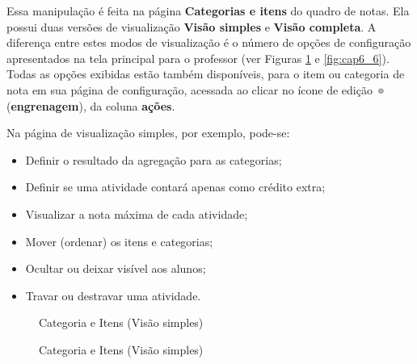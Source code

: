 Essa manipulação é feita na página \textbf{Categorias e itens} do quadro de notas. Ela possui duas versões de visualização \textbf{Visão simples} e \textbf{Visão completa}. A diferença entre estes modos de visualização é o número de opções de configuração apresentados na tela principal para o professor (ver Figuras \ref{fig:cap6_1} e \ref{fig:cap6_6}). Todas as opções exibidas estão também disponíveis, para o item ou categoria de nota em sua página de configuração, acessada ao clicar no ícone de edição \includegraphics[width=0.02\textwidth]{imagem/cap5/fig7.jpg} (\textbf{engrenagem}), da coluna \textbf{ações}.

Na página de visualização simples, por exemplo, pode-se:

\begin{itemize}
 \item Definir o resultado da agregação para as categorias;
 \item Definir se uma atividade contará apenas como crédito extra;
 \item Visualizar a nota máxima de cada atividade;
 \item Mover (ordenar) os itens e categorias;
 \item Ocultar ou deixar visível aos alunos;
 \item Travar ou destravar uma atividade.
\end{itemize}

\begin{figure}[htbp]
 \begin{center}
  \caption{Categoria e Itens (Visão simples)}
  \label{fig:cap6_1}
 \end{center}
\end{figure}

\begin{figure}[htbp]
 \begin{center}
  \caption{Categoria e Itens (Visão simples)}
  \label{fig:cap6_2}
 \end{center}
\end{figure}

